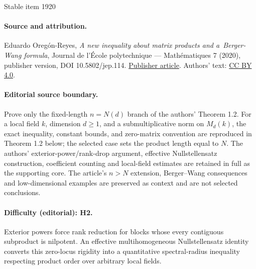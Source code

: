 \documentclass[11pt]{article}
\begin{document}
\begin{center}{\Large Stable item 1920}\end{center}
\paragraph{Source and attribution.}
Eduardo Oregón-Reyes, \emph{A new inequality about matrix products and a Berger-Wang formula}, Journal de l’École polytechnique — Mathématiques 7 (2020), publisher version, DOI 10.5802/jep.114. \href{https://jep.centre-mersenne.org/articles/10.5802/jep.114/}{Publisher article}. Authors' text: \href{https://creativecommons.org/licenses/by/4.0/}{CC BY 4.0}.
\paragraph{Editorial source boundary.}
Prove only the fixed-length \(n=N(d)\) branch of the authors' Theorem 1.2. For a local field \(k\), dimension \(d\ge1\), and a submultiplicative norm on \(M_d(k)\), the exact inequality, constant bounds, and zero-matrix convention are reproduced in Theorem 1.2 below; the selected case sets the product length equal to \(N\). The authors' exterior-power/rank-drop argument, effective Nullstellensatz construction, coefficient counting and local-field estimates are retained in full as the supporting core. The article's \(n>N\) extension, Berger--Wang consequences and low-dimensional examples are preserved as context and are not selected conclusions.
\paragraph{Difficulty (editorial): H2.}
Exterior powers force rank reduction for blocks whose every contiguous subproduct is nilpotent. An effective multihomogeneous Nullstellensatz identity converts this zero-locus rigidity into a quantitative spectral-radius inequality respecting product order over arbitrary local fields.
\end{document}
